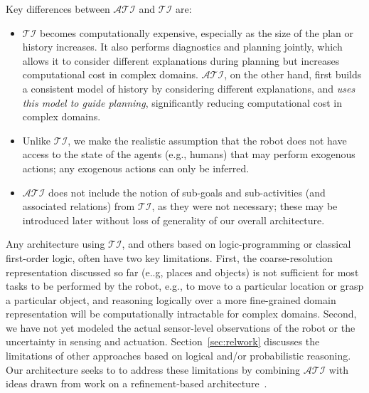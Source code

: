 \documentclass[letterpaper, 10 pt, conference]{ieeeconf}  %
\begin{document}
Key differences between $\mathcal{ATI}$ and $\mathcal{TI}$ are:
\begin{itemize}
\item $\mathcal{TI}$ becomes computationally expensive, especially as
  the size of the plan or history increases. It also performs
  diagnostics and planning jointly, which allows it to consider
  different explanations during planning but increases computational
  cost in complex domains. $\mathcal{ATI}$, on the other hand, first
  builds a consistent model of history by considering different
  explanations, and \emph{uses this model to guide planning},
  significantly reducing computational cost in complex domains.
\item Unlike $\mathcal{TI}$, we make the realistic assumption that the
  robot does not have access to the state of the agents (e.g., humans)
  that may perform exogenous actions; any exogenous actions can only
  be inferred.
\item $\mathcal{ATI}$ does not include the notion of sub-goals and
  sub-activities (and associated relations) from $\mathcal{TI}$, as
  they were not necessary; these may be introduced later without loss
  of generality of our overall architecture.
\end{itemize}
Any architecture using $\mathcal{TI}$, and others based on
logic-programming or classical first-order logic, often have two key
limitations. First, the coarse-resolution representation discussed so
far (e..g, places and objects) is not sufficient for most tasks to be
performed by the robot, e.g., to move to a particular location or
grasp a particular object, and reasoning logically over a more
fine-grained domain representation will be computationally intractable
for complex domains. Second, we have not yet modeled the actual
sensor-level observations of the robot or the uncertainty in sensing
and actuation. Section~\ref{sec:relwork} discusses the limitations of
other approaches based on logical and/or probabilistic reasoning. Our
architecture seeks to to address these limitations by combining
$\mathcal{ATI}$ with ideas drawn from work on a refinement-based
architecture~\cite{sridharan2017refinement}.
\end{document}
